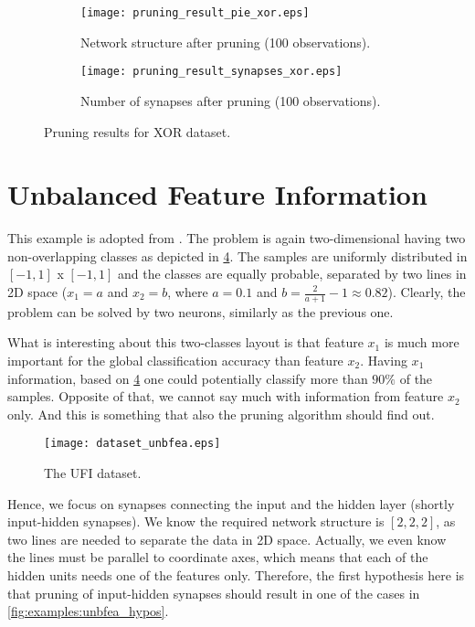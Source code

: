 \begin{figure}[H]
\centering
\begin{subfigure}{.4\textwidth}
  \centering
  \texttt{[image: pruning\_result\_pie\_xor.eps]}
  \caption{Network structure after pruning (100 observations).}
  \label{fig:examples:pie_xor}
\end{subfigure}
\begin{subfigure}{.4\textwidth}
  \centering
  \texttt{[image: pruning\_result\_synapses\_xor.eps]}
  \caption{Number of synapses after pruning (100 observations).}
  \label{fig:examples:result_synapses_xor}
\end{subfigure}
\caption{Pruning results for XOR dataset.}
\label{fig:examples:pruning_result_xor}
\end{figure}

\section{Unbalanced Feature Information} \label{sec:example_ufi}
This example is adopted from \citep{karnin}. The problem is again two-dimensional having two non-overlapping classes as depicted in \cref{fig:examples:dataset_unbfea}. The samples are uniformly distributed in $ [-1, 1] $ x $ [-1, 1] $ and the classes are equally probable, separated by two lines in 2D space ($ x_1 = a $ and $ x_2 = b $, where $ a = 0.1 $ and $ b = \frac{2}{a+1} - 1 \approx 0.82 $). Clearly, the problem can be solved by two neurons, similarly as the previous one.

What is interesting about this two-classes layout is that feature $ x_1 $ is much more important for the global classification accuracy than feature $ x_2 $. Having $ x_1 $ information, based on \cref{fig:examples:dataset_unbfea} one could potentially classify more than $ 90\% $ of the samples. Opposite of that, we cannot say much with information from feature $ x_2 $ only. And this is something that also the pruning algorithm should find out.

\begin{figure}[H]
\centering
\texttt{[image: dataset\_unbfea.eps]}
\caption{The UFI dataset.}
\label{fig:examples:dataset_unbfea}
\end{figure}

Hence, we focus on synapses connecting the input and the hidden layer (shortly input-hidden synapses). We know the required network structure is $ [2, 2, 2] $, as two lines are needed to separate the data in 2D space. Actually, we even know the lines must be parallel to coordinate axes, which means that each of the hidden units needs one of the features only. Therefore, the first hypothesis here is that pruning of input-hidden synapses should result in one of the cases in \cref{fig:examples:unbfea_hypos}.

